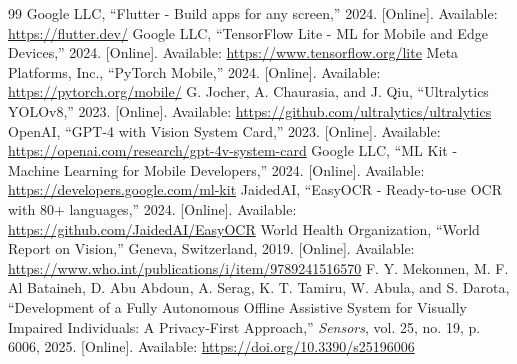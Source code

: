 \documentclass[a4paper]{report}
\begin{document}
\begin{thebibliography}{99}
   Google LLC, ``Flutter - Build apps for any screen,'' 2024. [Online]. Available: \url{https://flutter.dev/}
   Google LLC, ``TensorFlow Lite - ML for Mobile and Edge Devices,'' 2024. [Online]. Available: \url{https://www.tensorflow.org/lite}
   Meta Platforms, Inc., ``PyTorch Mobile,'' 2024. [Online]. Available: \url{https://pytorch.org/mobile/}
   G. Jocher, A. Chaurasia, and J. Qiu, ``Ultralytics YOLOv8,'' 2023. [Online]. Available: \url{https://github.com/ultralytics/ultralytics}
   OpenAI, ``GPT-4 with Vision System Card,'' 2023. [Online]. Available: \url{https://openai.com/research/gpt-4v-system-card}
   Google LLC, ``ML Kit - Machine Learning for Mobile Developers,'' 2024. [Online]. Available: \url{https://developers.google.com/ml-kit}
   JaidedAI, ``EasyOCR - Ready-to-use OCR with 80+ languages,'' 2024. [Online]. Available: \url{https://github.com/JaidedAI/EasyOCR}
   World Health Organization, ``World Report on Vision,'' Geneva, Switzerland, 2019. [Online]. Available: \url{https://www.who.int/publications/i/item/9789241516570}
   F. Y. Mekonnen, M. F. Al Bataineh, D. Abu Abdoun, A. Serag, K. T. Tamiru, W. Abula, and S. Darota, ``Development of a Fully Autonomous Offline Assistive System for Visually Impaired Individuals: A Privacy-First Approach,'' \textit{Sensors}, vol. 25, no. 19, p. 6006, 2025. [Online]. Available: \url{https://doi.org/10.3390/s25196006}
\end{thebibliography}
\end{document}
